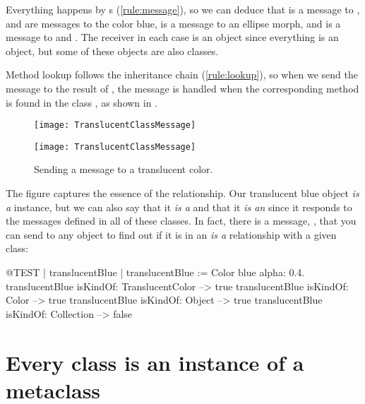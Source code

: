 \documentclass[a4paper,10pt,twoside]{book}
\begin{document}
Everything happens by s (\ref{rule:message}), so we can deduce that  is a message to ,  and  are messages to the color blue,  is a message to an ellipse morph, and  is a message to  and .
The receiver in each case is an object since everything is an object, but some of these objects are also classes.

Method lookup follows the inheritance chain (\ref{rule:lookup}), so when we send the message  to the result of , the message is handled when the corresponding method is found in the class , as shown in .

\begin{center}
\begin{figure}[!ht]
\ifluluelse
	{\centerline{\texttt{[image: TranslucentClassMessage]}}}
	{\centerline{\texttt{[image: TranslucentClassMessage]}}}
\caption{Sending a message to a translucent color.\label{fig:classmessage}}
\end{figure}
\end{center}

The figure captures the essence of the  relationship.
Our translucent blue object \emph{is a}  instance, but we can also say that it \emph{is a}  and that it \emph{is an}  since it responds to the messages defined in all of these classes.
In fact, there is a message, , that you can send to any object to find out if it is in an \emph{is a} relationship with a given class:
\begin{code}{@TEST | translucentBlue |}
translucentBlue := Color blue alpha: 0.4.
translucentBlue isKindOf: TranslucentColor --> true
translucentBlue isKindOf: Color                    --> true
translucentBlue isKindOf: Object                  --> true
translucentBlue isKindOf: Collection              --> false
\end{code}

\section{Every class is an instance of a metaclass}
\end{document}
